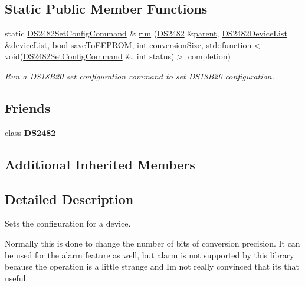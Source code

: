 \subsection*{Static Public Member Functions}
\begin{DoxyCompactItemize}
\item 
static \mbox{\hyperlink{class_d_s2482_set_config_command}{D\+S2482\+Set\+Config\+Command}} \& \mbox{\hyperlink{class_d_s2482_set_config_command_afbf596cbb1c6e8f5d97918aa54946d2f}{run}} (\mbox{\hyperlink{class_d_s2482}{D\+S2482}} \&\mbox{\hyperlink{class_d_s2482_command_a54a41fb8a610ef2077f5e5377771aaf3}{parent}}, \mbox{\hyperlink{class_d_s2482_device_list}{D\+S2482\+Device\+List}} \&device\+List, bool save\+To\+E\+E\+P\+R\+OM, int conversion\+Size, std\+::function$<$ void(\mbox{\hyperlink{class_d_s2482_set_config_command}{D\+S2482\+Set\+Config\+Command}} \&, int status)$>$ completion)
\begin{DoxyCompactList}\small\item\em Run a D\+S18\+B20 set configuration command to set D\+S18\+B20 configuration. \end{DoxyCompactList}\end{DoxyCompactItemize}
\subsection*{Friends}
\begin{DoxyCompactItemize}
\item 
\mbox{\label{class_d_s2482_set_config_command_afeaf69274324e8dbeebede05c02d9c18}} 
class {\bfseries D\+S2482}
\end{DoxyCompactItemize}
\subsection*{Additional Inherited Members}


\subsection{Detailed Description}
Sets the configuration for a device. 

Normally this is done to change the number of bits of conversion precision. It can be used for the alarm feature as well, but alarm is not supported by this library because the operation is a little strange and I\textquotesingle{}m not really convinced that it\textquotesingle{}s that useful.

